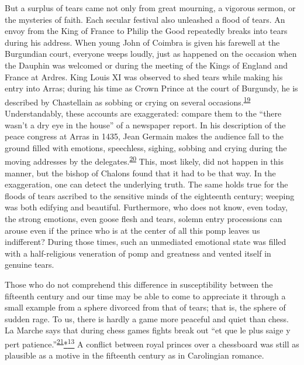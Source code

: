 \protect\hypertarget{08_Chapter_One__THE_PASSIONATE_INTE.xhtmlux5cux23page_8}{}{}But
a surplus of tears came not only from great mourning, a vigorous sermon,
or the mysteries of faith. Each secular festival also unleashed a flood
of tears. An envoy from the King of France to Philip the Good repeatedly
breaks into tears during his address. When young John of Coimbra is
given his farewell at the Burgundian court, everyone weeps loudly, just
as happened on the occasion when the Dauphin was welcomed or during the
meeting of the Kings of England and France at Ardres. King Louis XI was
observed to shed tears while making his entry into Arras; during his
time as Crown Prince at the court of Burgundy, he is described by
Chastellain as sobbing or crying on several
occasions.\textsuperscript{\protect\hypertarget{08_Chapter_One__THE_PASSIONATE_INTE.xhtmlux5cux23id_2192}{\protect\hyperlink{23_NOTES.xhtmlux5cux23id_2193}{19}}}
Understandably, these accounts are exaggerated: compare them to the
``there wasn't a dry eye in the house'' of a newspaper report. In his
description of the peace congress at Arras in 1435, Jean Germain makes
the audience fall to the ground filled with emotions, speechless,
sighing, sobbing and crying during the moving addresses by the
delegates.\textsuperscript{\protect\hypertarget{08_Chapter_One__THE_PASSIONATE_INTE.xhtmlux5cux23id_2190}{\protect\hyperlink{23_NOTES.xhtmlux5cux23id_2191}{20}}}
This, most likely, did not happen in this manner, but the bishop of
Chalons found that it had to be that way. In the exaggeration, one can
detect the underlying truth. The same holds true for the floods of tears
ascribed to the sensitive minds of the eighteenth century; weeping was
both edifying and beautiful. Furthermore, who does not know, even today,
the strong emotions, even goose flesh and tears, solemn entry
processions can arouse even if the prince who is at the center of all
this pomp leaves us indifferent? During those times, such an unmediated
emotional state was filled with a half-religious veneration of pomp and
greatness and vented itself in genuine tears.

Those who do not comprehend this difference in susceptibility between
the fifteenth century and our time may be able to come to appreciate it
through a small example from a sphere divorced from that of tears; that
is, the sphere of sudden rage. To us, there is hardly a game more
peaceful and quiet than chess. La Marche says that during chess games
fights break out ``et que le plus saige y pert
patience.''\textsuperscript{\protect\hypertarget{08_Chapter_One__THE_PASSIONATE_INTE.xhtmlux5cux23id_2188}{\protect\hyperlink{23_NOTES.xhtmlux5cux23id_2189}{21}}}\protect\hypertarget{08_Chapter_One__THE_PASSIONATE_INTE.xhtmlux5cux23id_2305}{\protect\hyperlink{23_NOTES.xhtmlux5cux23id_2306}{*\textsuperscript{13}}}
A conflict between royal princes over a chessboard was still as
plausible as a motive in the fifteenth century as in Carolingian
romance.

